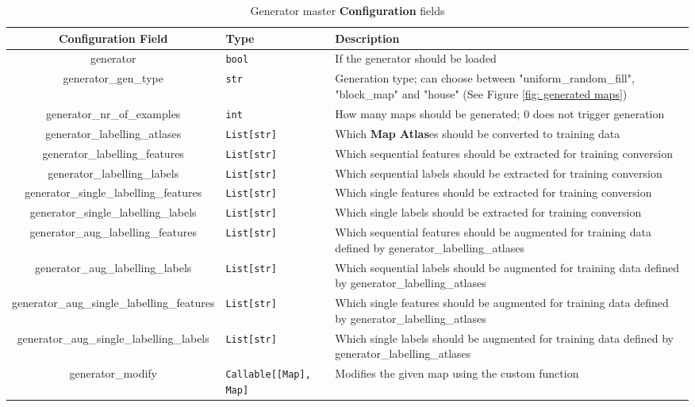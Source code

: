 \begin{appendices}
\pagebreak

\begin{table}[h!]
    \footnotesize
    \centerfloat
    \begin{tabular}{|c|M{2cm}|M{6cm}|}
        \hline
        \textbf{Configuration Field} & \textbf{Type} & \textbf{Description} \\
        \hline
        generator & \texttt{bool} & If the generator should be loaded \\
        \hline
        generator\_gen\_type & \texttt{str} & Generation type; can choose between "uniform\_random\_fill", "block\_map" and "house" (See Figure \ref{fig: generated maps}) \\
        \hline
        generator\_nr\_of\_examples & \texttt{int} & How many maps should be generated; 0 does not trigger generation \\
        \hline
        generator\_labelling\_atlases & \texttt{List[str]} & Which \textbf{Map Atlas}es should be converted to training data\\
        \hline
        generator\_labelling\_features & \texttt{List[str]} & Which sequential features should be extracted for training conversion \\
        \hline
        generator\_labelling\_labels & \texttt{List[str]} & Which sequential labels should be extracted for training conversion \\
        \hline
        generator\_single\_labelling\_features & \texttt{List[str]} & Which single features should be extracted for training conversion \\
        \hline
        generator\_single\_labelling\_labels & \texttt{List[str]} & Which single labels should be extracted for training conversion \\
        \hline
        generator\_aug\_labelling\_features & \texttt{List[str]} & Which sequential features should be augmented for training data defined by generator\_labelling\_atlases \\
        \hline
        generator\_aug\_labelling\_labels & \texttt{List[str]} & Which sequential labels should be augmented for training data defined by generator\_labelling\_atlases \\
        \hline
        generator\_aug\_single\_labelling\_features & \texttt{List[str]} & Which single features should be augmented for training data defined by generator\_labelling\_atlases \\
        \hline
        generator\_aug\_single\_labelling\_labels & \texttt{List[str]} & Which single labels should be augmented for training data defined by generator\_labelling\_atlases \\
        \hline
        generator\_modify & \texttt{Callable[[Map], Map]} & Modifies the given map using the custom function \\
        \hline
    \end{tabular}
    \caption{Generator master \textbf{Configuration} fields}
    \label{tab: generator_master_config}
\end{table}


\end{appendices}
